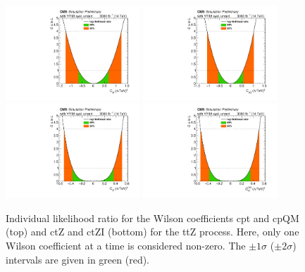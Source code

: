 \documentclass[letterpaper,11pt]{article}
\begin{document}
\begin{figure}[tbp]
  \centering
    \includegraphics[trim={0.4cm 0.2cm 0.8cm 0.cm},clip,width=0.45\textwidth]{Figures/1D_cpt_lumi3000_14TeV_CMScombine_r1_fullUnc.pdf}
    \includegraphics[trim={0.4cm 0.2cm 0.8cm 0.cm},clip,width=0.45\textwidth]{Figures/1D_cpQM_lumi3000_14TeV_CMScombine_r1_fullUnc.pdf}
    \includegraphics[trim={0.4cm 0.2cm 0.8cm 0.cm},clip,width=0.45\textwidth]{Figures/1D_ctZ_lumi3000_14TeV_CMScombine_r1_fullUnc.pdf}
    \includegraphics[trim={0.4cm 0.2cm 0.8cm 0.cm},clip,width=0.45\textwidth]{Figures/1D_ctZI_lumi3000_14TeV_CMScombine_r1_fullUnc.pdf}
  \caption{Individual likelihood ratio for the Wilson coefficients cpt and cpQM (top) and ctZ and ctZI (bottom) for the ttZ process.
           Here, only one Wilson coefficient at a time is considered non-zero.
           The $\pm 1\sigma$ ($\pm 2\sigma$) intervals are given in green (red).
           }
  \label{fig:ttZ_1Dnll}
\end{figure}
\end{document}
